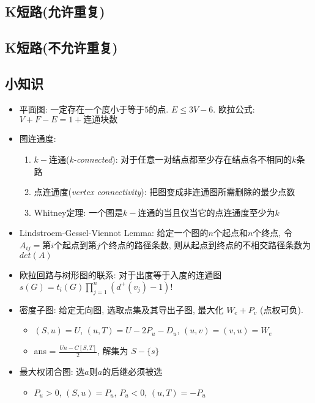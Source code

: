 \documentclass[landscape, twocolumn, 8pt, a4paper, twoside]{extarticle}
\begin{document}
\begin{spacing}{0.1}


\subsection{K短路(允许重复)}


\subsection{K短路(不允许重复)}


\subsection{小知识}
\begin{itemize}
\item 平面图: 一定存在一个度小于等于$5$的点. $E \le 3V - 6$. 欧拉公式: $V + F - E = 1 + \mbox{连通块数}$
\item 图连通度: 
  \begin{enumerate}
  \item $k-$连通(\emph{k-connected}): 对于任意一对结点都至少存在结点各不相同的$k$条路
  \item 点连通度(\emph{vertex connectivity}): 把图变成非连通图所需删除的最少点数
  \item Whitney定理: 一个图是$k-$连通的当且仅当它的点连通度至少为$k$
  \end{enumerate}
\item Lindstroem-Gessel-Viennot Lemma:
  给定一个图的$n$个起点和$n$个终点, 
  令$A_{ij} = $第$i$个起点到第$j$个终点的路径条数,
  则从起点到终点的不相交路径条数为 $det(A)$
\item 欧拉回路与树形图的联系: 
  对于出度等于入度的连通图
  $s(G) = t_i(G) \prod_{j = 1}^{n} (d^+(v_j) - 1)! $
\item 密度子图: 给定无向图, 选取点集及其导出子图, 最大化 $W_e + P_v$ (点权可负).
  \begin{itemize}
  \item $(S, u) = U$, $(u, T) = U - 2 P_u - D_u$, $(u, v) = (v, u) = W_e$
  \item ans = $\frac{Un - C[S, T]}{2}$, 解集为 $S - \{s\}$
  \end{itemize}
\item 最大权闭合图: 选$a$则$a$的后继必须被选
  \begin{itemize}
  \item $P_u > 0$, $(S, u) = P_u$, $P_u < 0$, $(u, T) = -P_u$

\end{itemize}
\end{itemize}
\end{spacing}
\end{document}

